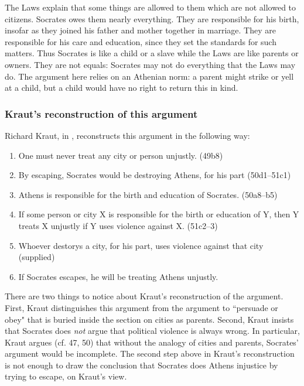 \documentclass[12pt,letterpaper]{article}
\begin{document}
The Laws explain that some things are allowed to them which are not allowed
to citizens. Socrates owes them nearly everything. They are responsible
for his birth, insofar as they joined his father and mother together in
marriage. They are responsible for his care and education, since they set
the standards for such matters. Thus Socrates is like a child or a slave
while the Laws are like parents or owners. They are not equals: Socrates
may not do everything that the Laws may do. The argument here relies on an
Athenian norm: a parent might strike or yell at a child, but a child would
have no right to return this in kind.

\subsubsection*{Kraut's reconstruction of this argument}

Richard Kraut, in \cite{kraut-socrates-state-1984}, reconstructs this argument in the following way:

\begin{enumerate}

    \item One must never treat any city or person unjustly. (49b8)

    \item By escaping, Socrates would be destroying Athens, for his part (50d1--51c1)

    \item Athens is responsible for the birth and education of Socrates. (50a8--b5)

    \item If some person or city X is responsible for the birth or education of Y, then Y treats X unjustly if Y uses violence against X. (51c2--3)

    \item Whoever destorys a city, for his part, uses violence against that city (supplied)

    \item If Socrates escapes, he will be treating Athens unjustly.

\end{enumerate}

There are two things to notice about Kraut's reconstruction of the argument. First, Kraut distinguishes this argument from the argument to ``persuade or obey" that is buried inside the section on cities as parents. Second, Kraut insists that Socrates does \emph{not} argue that political violence is always wrong. In particular, Kraut argues (cf. 47, 50) that without the analogy of cities and parents, Socrates' argument would be incomplete. The second step above in Kraut's reconstruction is not enough to draw the conclusion that Socrates does Athens injustice by trying to escape, on Kraut's view.
\end{document}
